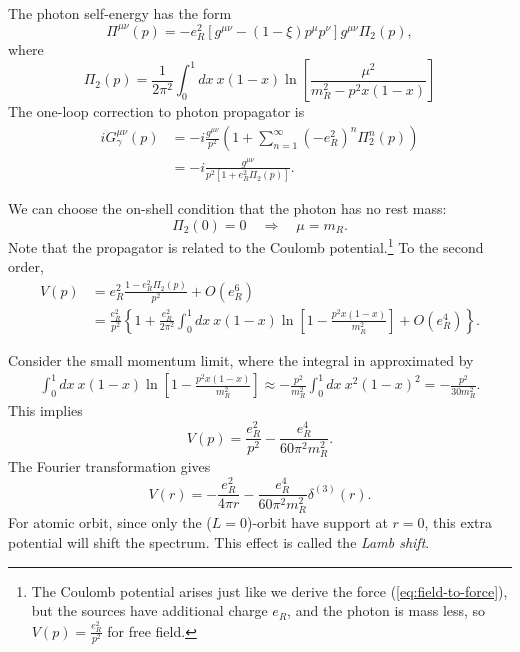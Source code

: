 \documentclass[aps,prb,superscriptaddress,nofootinbib]{revtex4}
\begin{document}
The photon self-energy has the form
\begin{equation}
	\Pi^{\mu\nu}(p) = -e_R^2 \left[g^{\mu\nu}-(1-\xi)p^\mu p^\nu\right] g^{\mu\nu} \Pi_2(p),
\end{equation}
where
\begin{equation}
	\Pi_2(p) = \frac{1}{2\pi^2} \int_0^1 dx\ x(1-x)
	\ln\left[\frac{\mu^2}{m_R^2-p^2 x(1-x)}\right]
\end{equation}
The one-loop correction to photon propagator is
\begin{equation}
\begin{aligned}
	iG^{\mu\nu}_\gamma(p) 
	&= -i \frac{g^{\mu\nu}}{p^2} \left(1 + \sum_{n=1}^\infty (-e_R^2)^n \Pi_2^n(p) \right) \\
	&= -i\frac{g^{\mu\nu}}{p^2 \left[1+e_R^2\Pi_2(p) \right]}.
\end{aligned}
\end{equation}

We can choose the on-shell condition that the photon has no rest mass:
\begin{equation}
	\Pi_2(0) = 0 \quad \Longrightarrow \quad
	\mu = m_R.
\end{equation}
Note that the propagator is related to the Coulomb potential.\footnote{The Coulomb potential arises just like we derive the force (\ref{eq:field-to-force}), but the sources have additional charge $e_R$, and the photon is mass less, so $V(p) = \frac{e_R^2}{p^2}$ for free field.
}
To the second order,
\begin{equation}
\begin{aligned}
	V(p) &= e_R^2 \frac{1-e_R^2 \Pi_2(p)}{p^2} + O(e_R^6) \\
	&= \frac{e_R^2}{p^2}\left\{1 + \frac{e_R^2}{2\pi^2}\int_0^1 dx\ x(1-x)\ln\left[1-\frac{p^2 x(1-x)}{m_R^2}\right] + O(e_R^4)\right\}.
\end{aligned}
\end{equation}

Consider the small momentum limit, where the integral in approximated by
\begin{equation}
\begin{aligned}
	\int_0^1 dx\ x(1-x)\ln\left[1-\frac{p^2 x(1-x)}{m_R^2}\right]
	\approx -\frac{p^2}{m_R^2} \int_0^1 dx\ x^2(1-x)^2 = -\frac{p^2}{30 m_R^2}.
\end{aligned}
\end{equation}
This implies
\begin{equation}
	V(p) = \frac{e_R^2}{p^2} - \frac{e_R^4}{60\pi^2 m_R^2}.
\end{equation}
The Fourier transformation gives
\begin{equation}
	V(r) = -\frac{e_R^2}{4\pi r} - \frac{e_R^4}{60\pi^2 m_R^2}\delta^{(3)}(r).
\end{equation}
For atomic orbit, since only the ($L=0$)-orbit have support at $r=0$, this extra potential will shift the spectrum.
This effect is called the \textit{Lamb shift}.
\end{document}
